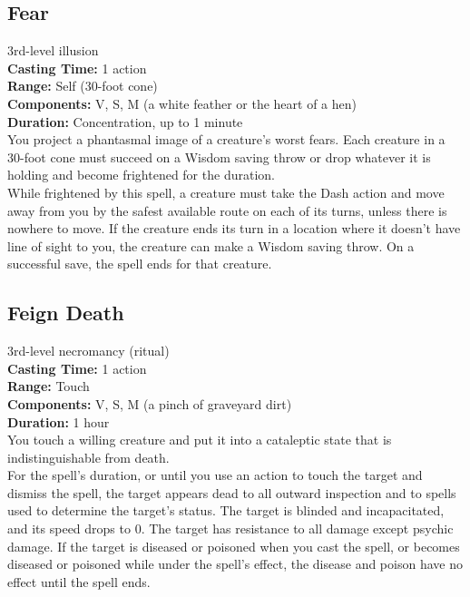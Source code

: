 \documentclass[11pt, A4paper, english]{article}
\begin{document}
		\subsection{Fear}
3rd-level illusion \\
\textbf{Casting Time:} 1 action \\
\textbf{Range:} Self (30-foot cone) \\
\textbf{Components:} V, S, M (a white feather or the heart of a hen) \\
\textbf{Duration:} Concentration, up to 1 minute \\
You project a phantasmal image of a creature’s worst fears. Each creature in a 30-foot cone must succeed on a Wisdom saving throw or drop whatever it is holding and become frightened for the duration. \\
While frightened by this spell, a creature must take the Dash action and move away from you by the safest available route on each of its turns, unless there is nowhere to move. If the creature ends its turn in a location where it doesn't have line of sight to you, the creature can make a Wisdom saving throw. On a successful save, the spell ends for that creature.

		\subsection{Feign Death}
3rd-level necromancy (ritual) \\
\textbf{Casting Time:} 1 action \\
\textbf{Range:} Touch \\
\textbf{Components:} V, S, M (a pinch of graveyard dirt) \\
\textbf{Duration:} 1 hour \\
You touch a willing creature and put it into a cataleptic state that is indistinguishable from death. \\
For the spell’s duration, or until you use an action to touch the target and dismiss the spell, the target appears dead to all outward inspection and to spells used to determine the target's status. The target is blinded and incapacitated, and its speed drops to 0. The target has resistance to all damage except psychic damage. If the target is diseased or poisoned when you cast the spell, or becomes diseased or poisoned while under the spell’s effect, the disease and poison have no effect until the spell ends.
\end{document}
